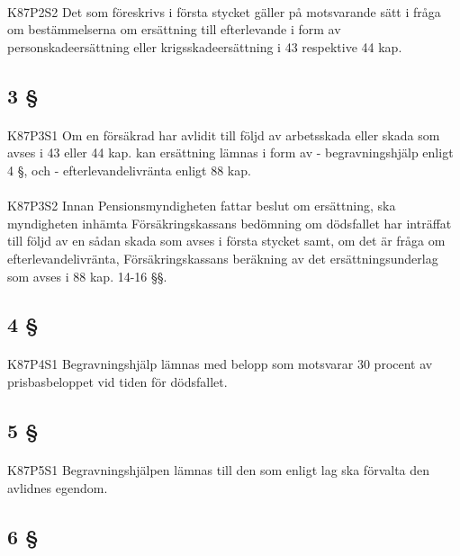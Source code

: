 \documentclass[a4paper,notitlepage,openany,10pt]{book}
\begin{document}
\paragraph*{}
{\tiny K87P2S2}
Det som föreskrivs i första stycket gäller på motsvarande sätt i fråga om bestämmelserna om ersättning till efterlevande i form av personskadeersättning eller krigsskadeersättning i 43 respektive 44 kap.
\subsection*{3 §}
\paragraph*{}
{\tiny K87P3S1}
Om en försäkrad har avlidit till följd av arbetsskada eller skada som avses i 43 eller 44 kap. kan ersättning lämnas i form av
\newline - begravningshjälp enligt 4 §, och
\newline - efterlevandelivränta enligt 88 kap.
\paragraph*{}
{\tiny K87P3S2}
Innan Pensionsmyndigheten fattar beslut om ersättning, ska myndigheten inhämta Försäkringskassans bedömning om dödsfallet har inträffat till följd av en sådan skada som avses i första stycket samt, om det är fråga om efterlevandelivränta, Försäkringskassans beräkning av det ersättningsunderlag som avses i 88 kap. 14-16 §§.
\subsection*{4 §}
\paragraph*{}
{\tiny K87P4S1}
Begravningshjälp lämnas med belopp som motsvarar 30 procent av prisbasbeloppet vid tiden för dödsfallet.
\subsection*{5 §}
\paragraph*{}
{\tiny K87P5S1}
Begravningshjälpen lämnas till den som enligt lag ska förvalta den avlidnes egendom.
\subsection*{6 §}
\end{document}
